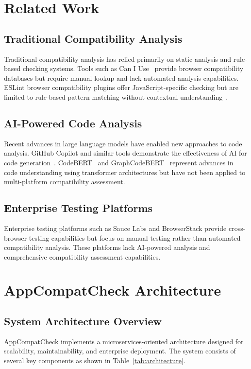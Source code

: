 \documentclass[conference]{IEEEtran}
\begin{document}
\section{Related Work}

\subsection{Traditional Compatibility Analysis}
Traditional compatibility analysis has relied primarily on static analysis and rule-based checking systems. Tools such as Can I Use~\cite{caniuse} provide browser compatibility databases but require manual lookup and lack automated analysis capabilities. ESLint browser compatibility plugins offer JavaScript-specific checking but are limited to rule-based pattern matching without contextual understanding~\cite{eslint-compat}.

\subsection{AI-Powered Code Analysis}
Recent advances in large language models have enabled new approaches to code analysis. GitHub Copilot and similar tools demonstrate the effectiveness of AI for code generation~\cite{chen2021evaluating}. CodeBERT~\cite{feng2020codebert} and GraphCodeBERT~\cite{guo2021graphcodebert} represent advances in code understanding using transformer architectures but have not been applied to multi-platform compatibility assessment.

\subsection{Enterprise Testing Platforms}
Enterprise testing platforms such as Sauce Labs and BrowserStack provide cross-browser testing capabilities but focus on manual testing rather than automated compatibility analysis. These platforms lack AI-powered analysis and comprehensive compatibility assessment capabilities.

\section{AppCompatCheck Architecture}

\subsection{System Architecture Overview}
AppCompatCheck implements a microservices-oriented architecture designed for scalability, maintainability, and enterprise deployment. The system consists of several key components as shown in Table~\ref{tab:architecture}.
\end{document}

